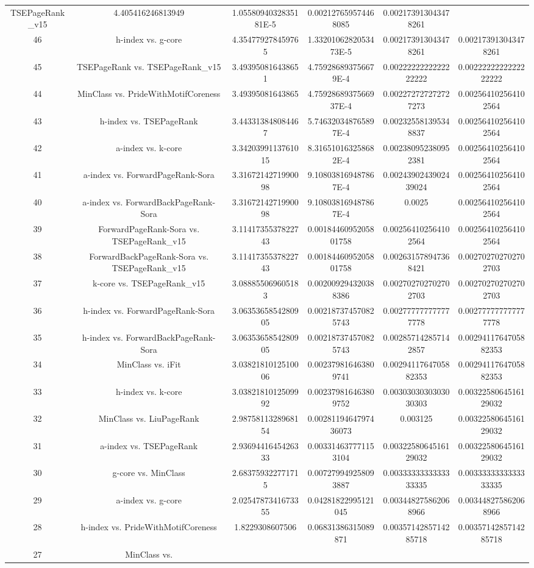 \documentclass[a4paper,10pt]{article}
\begin{document}
\begin{landscape}
\begin{table}[!htp]
\begin{tabular}{cccccc}
TSEPageRank_v15&4.405416246813949&1.0558094032835181E-5&0.002127659574468085&0.002173913043478261\\46&h-index vs. g-core&4.354779278459765&1.3320106282053473E-5&0.002173913043478261&0.002173913043478261\\45&TSEPageRank vs. TSEPageRank_v15&3.493950816438651&4.759286893756679E-4&0.0022222222222222222&0.0022222222222222222\\44&MinClass vs. PrideWithMotifCoreness&3.49395081643865&4.7592868937566937E-4&0.002272727272727273&0.002564102564102564\\43&h-index vs. TSEPageRank&3.443313848084467&5.746320348765897E-4&0.002325581395348837&0.002564102564102564\\42&a-index vs. k-core&3.3420399113761015&8.316510163258682E-4&0.002380952380952381&0.002564102564102564\\41&a-index vs. ForwardPageRank-Sora&3.3167214271990098&9.108038169487867E-4&0.0024390243902439024&0.002564102564102564\\40&a-index vs. ForwardBackPageRank-Sora&3.3167214271990098&9.108038169487867E-4&0.0025&0.002564102564102564\\39&ForwardPageRank-Sora vs. TSEPageRank_v15&3.1141735537822743&0.0018446095205801758&0.002564102564102564&0.002564102564102564\\38&ForwardBackPageRank-Sora vs. TSEPageRank_v15&3.1141735537822743&0.0018446095205801758&0.002631578947368421&0.002702702702702703\\37&k-core vs. TSEPageRank_v15&3.088855069605183&0.002009294320388386&0.002702702702702703&0.002702702702702703\\36&h-index vs. ForwardPageRank-Sora&3.0635365854280905&0.002187374570825743&0.002777777777777778&0.002777777777777778\\35&h-index vs. ForwardBackPageRank-Sora&3.0635365854280905&0.002187374570825743&0.002857142857142857&0.0029411764705882353\\34&MinClass vs. iFit&3.0382181012510006&0.002379816463809741&0.0029411764705882353&0.0029411764705882353\\33&h-index vs. k-core&3.0382181012509992&0.002379816463809752&0.0030303030303030303&0.0032258064516129032\\32&MinClass vs. LiuPageRank&2.9875811328968154&0.0028119464797436073&0.003125&0.0032258064516129032\\31&a-index vs. TSEPageRank&2.9369441645426333&0.003314637771153104&0.0032258064516129032&0.0032258064516129032\\30&g-core vs. MinClass&2.683759322771715&0.007279949258093887&0.0033333333333333335&0.0033333333333333335\\29&a-index vs. g-core&2.0254787341673355&0.04281822995121045&0.003448275862068966&0.003448275862068966\\28&h-index vs. PrideWithMotifCoreness&1.8229308607506&0.06831386315089871&0.0035714285714285718&0.0035714285714285718\\27&MinClass vs. 
\end{tabular}
\end{table}
\end{landscape}
\end{document}
